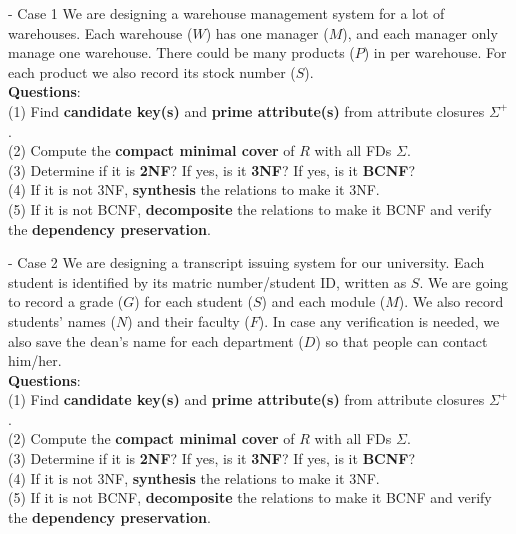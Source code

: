 \begin{frame}[fragile]{ - Case 1}
	We are designing a warehouse management system for a lot of warehouses. Each warehouse ($W$) has one manager ($M$), and each manager only manage one warehouse. There could be many products ($P$) in per warehouse. For each product we also record its stock number ($S$).\\\vspace{10pt}
	\textbf{Questions}:\\
	(1) Find \textbf{candidate key(s)} and \textbf{prime attribute(s)} from attribute closures $\Sigma^{+}$.\\
	(2) Compute the \textbf{compact minimal cover} of $R$ with all FDs $\Sigma$.\\
	(3) Determine if it is \textbf{2NF}? If yes, is it \textbf{3NF}? If yes, is it \textbf{BCNF}?\\
	(4) If it is not 3NF, \textbf{synthesis} the relations to make it 3NF.\\
	(5) If it is not BCNF, \textbf{decomposite} the relations to make it BCNF and verify the \textbf{dependency preservation}. 
\end{frame}

\begin{frame}[fragile]{ - Case 2}
	We are designing a transcript issuing system for our university. 
	Each student is identified by its matric number/student ID, written as $S$.
	We are going to record a grade ($G$) for each student ($S$) and each module ($M$).
	We also record students' names ($N$) and their faculty ($F$). In case any verification is needed, we also save the dean's name for each department ($D$) so that people can contact him/her.\\\vspace{10pt}
	\textbf{Questions}:\\
	(1) Find \textbf{candidate key(s)} and \textbf{prime attribute(s)} from attribute closures $\Sigma^{+}$.\\
	(2) Compute the \textbf{compact minimal cover} of $R$ with all FDs $\Sigma$.\\
	(3) Determine if it is \textbf{2NF}? If yes, is it \textbf{3NF}? If yes, is it \textbf{BCNF}?\\
	(4) If it is not 3NF, \textbf{synthesis} the relations to make it 3NF.\\
	(5) If it is not BCNF, \textbf{decomposite} the relations to make it BCNF and verify the \textbf{dependency preservation}. 
\end{frame}

